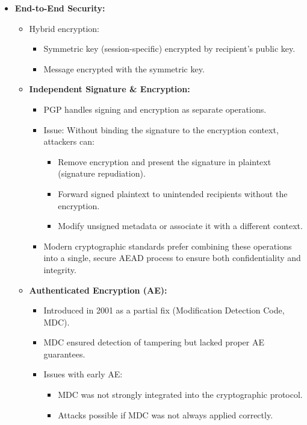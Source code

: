 \begin{itemize}
    \item \textbf{End-to-End Security:}
    \begin{itemize}
        \item Hybrid encryption:
        \begin{itemize}
            \item Symmetric key (session-specific) encrypted by recipient's public key.
            \item Message encrypted with the symmetric key.
        \end{itemize}
        \item \textbf{Independent Signature \& Encryption:}
        \begin{itemize}
            \item PGP handles signing and encryption as separate operations.
            \item Issue: Without binding the signature to the encryption context, attackers can:
            \begin{itemize}
                \item Remove encryption and present the signature in plaintext (signature repudiation).
                \item Forward signed plaintext to unintended recipients without the encryption.
                \item Modify unsigned metadata or associate it with a different context.
            \end{itemize}
            \item Modern cryptographic standards prefer combining these operations into a single, secure AEAD process to ensure both confidentiality and integrity.
        \end{itemize}
        \item \textbf{Authenticated Encryption (AE):}
        \begin{itemize}
            \item Introduced in 2001 as a partial fix (Modification Detection Code, MDC).
            \item MDC ensured detection of tampering but lacked proper AE guarantees.
            \item Issues with early AE:
            \begin{itemize}
                \item MDC was not strongly integrated into the cryptographic protocol.
                \item Attacks possible if MDC was not always applied correctly.

\end{itemize}
\end{itemize}
\end{itemize}
\end{itemize}
